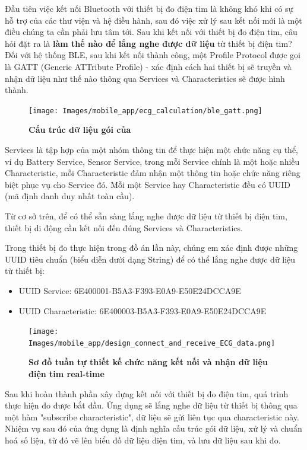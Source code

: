 Đầu tiên việc kết nối Bluetooth với thiết bị đo điện tim là không khó khi có sự hỗ trợ của các thư viện và hệ điều hành, sau đó việc xử lý sau
kết nối mới là một điều chúng ta cần phải lưu tâm tới. Sau khi kết nối với thiết bị đo điện tim, câu hỏi đặt ra là \textbf{làm thế nào
để lắng nghe được dữ liệu} từ thiết bị điện tim? Đối với hệ thống BLE, sau khi kết nối thành công, một Profile Protocol được gọi
là GATT \cite{intro_ble_gatt} (Generic ATTribute Profile) - xác định cách hai thiết bị sẽ truyền và nhận dữ liệu như thế nào thông qua
Services và Characteristics sẽ được hình thành.
\begin{figure}[H]
  \centering
  \texttt{[image: Images/mobile\_app/ecg\_calculation/ble\_gatt.png]}
  \caption[Cấu trúc dữ liệu gói của]{\bfseries \fontsize{12pt}{0pt}
  \selectfont Cấu trúc dữ liệu gói của}
  \label{ble_gatt} %
\end{figure}
Services là tập hợp của một nhóm thông tin để thực hiện một chức năng cụ thể,
ví dụ Battery Service, Sensor Service, trong mỗi Service chính là một hoặc nhiều Characteristic, mỗi Characteristic đảm nhận
một thông tin hoặc chức năng riêng biệt phục vụ cho Service đó. Mỗi một Service hay Characteristic đều có UUID (mã định danh duy nhất toàn cầu).

Từ cơ sở trên, để có thể sẵn sàng lắng nghe được dữ liệu từ thiết bị điện tim, thiết bị di động cần kết nối đến đúng Services và Characteristics.

Trong thiết bị đo thực hiện trong đồ án lần này, chúng em xác định được những UUID tiêu chuẩn (biểu diễn dưới dạng String) để có thể lắng nghe được dữ liệu từ
thiết bị:
\begin{itemize}
  \item UUID Service: 6E400001-B5A3-F393-E0A9-E50E24DCCA9E
  \item UUID Characteristic: 6E400003-B5A3-F393-E0A9-E50E24DCCA9E
\end{itemize}

\begin{figure}[H]
  \centering
  \texttt{[image: Images/mobile\_app/design\_connect\_and\_receive\_ECG\_data.png]}
  \caption[Sơ đồ tuần tự thiết kế chức năng kết nối và nhận dữ liệu điện tim real-time]{\bfseries \fontsize{12pt}{0pt}
  \selectfont Sơ đồ tuần tự thiết kế chức năng kết nối và nhận dữ liệu điện tim real-time}
  \label{seq_auth} %
\end{figure}

Sau khi hoàn thành phần xây dựng kết nối với thiết bị đo điện tim, quá trình thực hiện đo được bắt đầu. Ứng dụng sẽ lắng nghe
dữ liệu từ thiết bị thông qua một hàm "subscribe characteristic", dữ liệu sẽ gửi liên tục qua characteristic này. Nhiệm vụ sau đó của ứng dụng là
định nghĩa cấu trúc gói dữ liệu, xử lý và chuẩn hoá số liệu, từ đó vẽ lên biểu đồ dữ liệu điện tim, và lưu dữ liệu sau khi đo.


